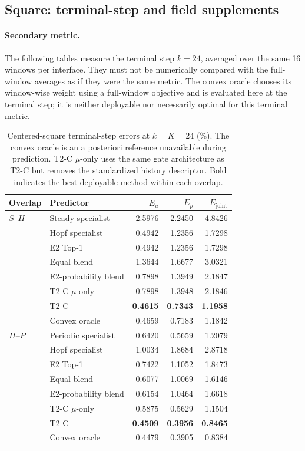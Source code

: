 \subsection{Square: terminal-step and field supplements}
\label{app:square_terminal}

\paragraph{Secondary metric.}
The following tables measure the terminal step $k=24$, averaged over
the same 16 windows per interface. They must not be numerically compared
with the full-window averages as if they were the same metric.
The convex oracle chooses its window-wise weight using a full-window
objective and is evaluated here at the terminal step; it is neither
deployable nor necessarily optimal for this terminal metric.

\begin{table}[H]
\centering
\caption{
Centered-square terminal-step errors at $k=K=24$ (\%). The convex oracle is an a posteriori reference unavailable during prediction.
T2-C $\mu$-only uses the same gate architecture as T2-C but removes the standardized history descriptor. Bold indicates the best deployable method within each overlap.
}
\label{tab:square_fusion_full}
\small
\setlength{\tabcolsep}{5pt}
\begin{tabular}{@{}llrrr@{}}
\toprule
Overlap & Predictor & $E_u$ & $E_p$ & $E_{\mathrm{joint}}$ \\
\midrule
$S$--$H$ & Steady specialist & 2.5976 & 2.2450 & 4.8426 \\
 & Hopf specialist & 0.4942 & 1.2356 & 1.7298 \\
 & E2 Top-1 & 0.4942 & 1.2356 & 1.7298 \\
 & Equal blend & 1.3644 & 1.6677 & 3.0321 \\
 & E2-probability blend & 0.7898 & 1.3949 & 2.1847 \\
 & T2-C $\mu$-only & 0.7898 & 1.3948 & 2.1846 \\
 & T2-C & \textbf{0.4615} & \textbf{0.7343} & \textbf{1.1958} \\
 & Convex oracle & 0.4659 & 0.7183 & 1.1842 \\
\midrule
$H$--$P$ & Periodic specialist & 0.6420 & 0.5659 & 1.2079 \\
 & Hopf specialist & 1.0034 & 1.8684 & 2.8718 \\
 & E2 Top-1 & 0.7422 & 1.1052 & 1.8473 \\
 & Equal blend & 0.6077 & 1.0069 & 1.6146 \\
 & E2-probability blend & 0.6154 & 1.0464 & 1.6618 \\
 & T2-C $\mu$-only & 0.5875 & 0.5629 & 1.1504 \\
 & T2-C & \textbf{0.4509} & \textbf{0.3956} & \textbf{0.8465} \\
 & Convex oracle & 0.4479 & 0.3905 & 0.8384 \\
\bottomrule
\end{tabular}
\end{table}


